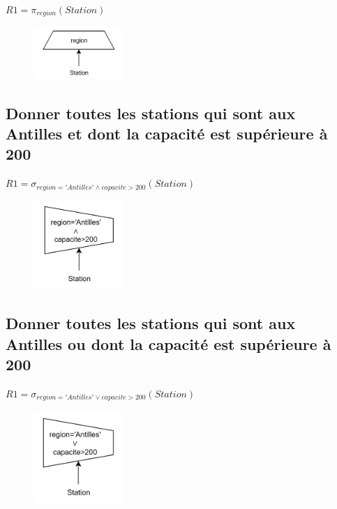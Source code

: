 \documentclass{article}
\begin{document}
$ R1 = \pi_{region}(Station)$

\begin{figure}[H]
  \centering
  \includegraphics[width=0.3\textwidth]{imgAlgGraph/3.png}
  \label{fig:3}
\end{figure}

\subsection{Donner toutes les stations qui sont aux Antilles et dont la capacité est supérieure à 200}

$ R1 = \sigma_{region = 'Antilles' \wedge capacite > 200}(Station)$

\begin{figure}[H]
  \centering
  \includegraphics[width=0.3\textwidth]{imgAlgGraph/4.png}
  \label{fig:4}
\end{figure}

\subsection{Donner toutes les stations qui sont aux Antilles ou dont la capacité est supérieure à 200}

$ R1 = \sigma_{region = 'Antilles' \vee capacite > 200}(Station)$

\begin{figure}[H]
  \centering
  \includegraphics[width=0.3\textwidth]{imgAlgGraph/5.png}
  \label{fig:5}
\end{figure}
\end{document}

